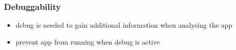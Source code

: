 \subsubsection{Debuggability} \label{subsection:section:counter-improve-tampering-debuggable}
\begin{itemize}
    \item debug is needed to gain additional information when analysing the app
    \item prevent app from running when debug is active
\end{itemize}
